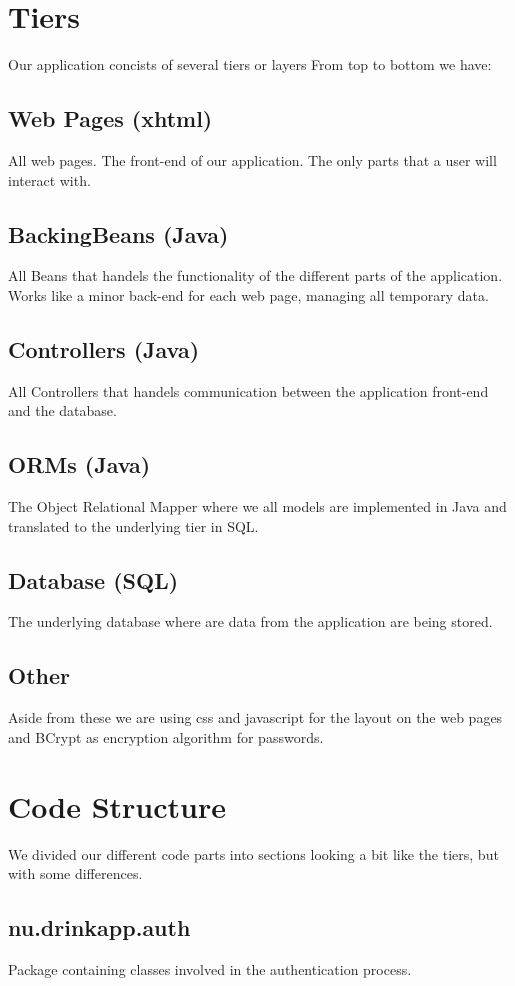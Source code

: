 \documentclass[a4paper]{article}
\begin{document}
\section{Tiers}
Our application concists of several tiers or layers
From top to bottom we have:

\subsection{Web Pages (xhtml)}
All web pages. The front-end of our application. The only parts that a user will interact with.
\subsection{BackingBeans (Java)}
All Beans that handels the functionality of the different parts of the application. Works like a minor back-end for each web page, managing all temporary data.
\subsection{Controllers (Java)}
All Controllers that handels communication between the application front-end and the database.
\subsection{ORMs (Java)}
The Object Relational Mapper where we all models are implemented in Java and translated to the underlying tier in SQL. 
\subsection{Database (SQL)}
The underlying database where are data from the application are being stored.
\subsection{Other}
Aside from these we are using css and javascript for the layout on the web pages and BCrypt as encryption algorithm for passwords. 

\section{Code Structure}
We divided our different code parts into sections looking a bit like the tiers, but with some differences.

\subsection{nu.drinkapp.auth}
Package containing classes involved in the authentication process.
\end{document}
